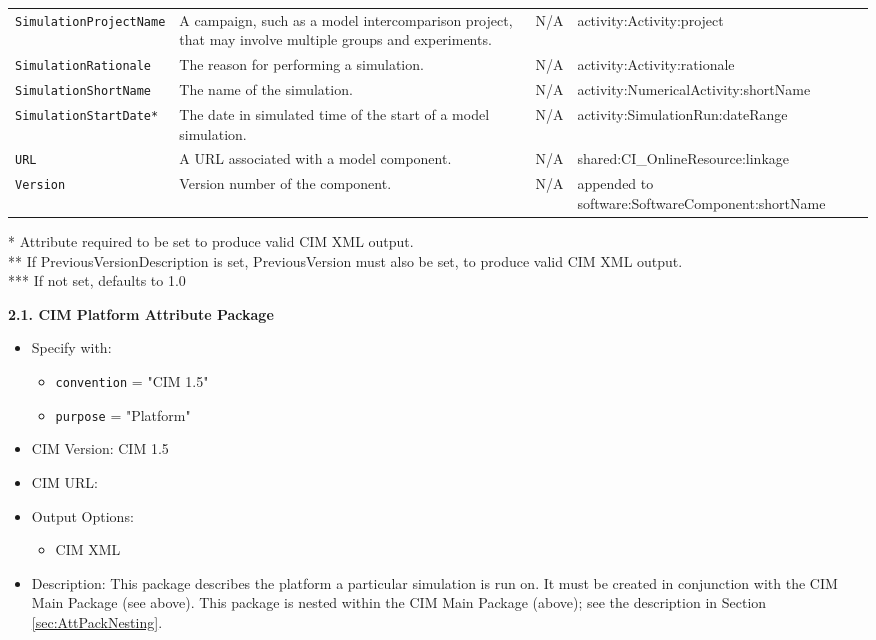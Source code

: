 \begin{tabular}{|p{7cm}|p{5cm}|p{15mm}|p{15mm}|}
     {\tt SimulationProjectName} & A campaign, such as a model intercomparison project, that may involve multiple groups and experiments. & N/A & activity:Activity:project \\
     {\tt SimulationRationale} & The reason for performing a simulation. & N/A  & activity:Activity:rationale \\
     {\tt SimulationShortName} & The name of the simulation. & N/A & activity:NumericalActivity:shortName \\
     {\tt SimulationStartDate*} & The date in simulated time of the start of a model simulation. & N/A & activity:SimulationRun:dateRange \\
     {\tt URL} & A URL associated with a model component. & N/A & shared:CI\_OnlineResource:linkage \\
     {\tt Version} & Version number of the component. & N/A  & appended to software:SoftwareComponent:shortName \\
     \hline\hline
\end{tabular}
\linebreak
 * Attribute required to be set to produce valid CIM XML output. \\
 ** If PreviousVersionDescription is set, PreviousVersion must also be set, to produce valid CIM XML output. \\
 *** If not set, defaults to 1.0

\vspace{.20in}

{\bf 2.1. CIM Platform Attribute Package}

\begin{itemize}
    \item Specify with:
    \begin{itemize}
        \item {\tt convention} = "CIM 1.5"
        \item {\tt purpose} = "Platform"
    \end{itemize}
    \item CIM Version: CIM 1.5
    \item CIM URL: 
    \item Output Options:
    \begin{itemize}
       \item CIM XML 
    \end{itemize} 
    \item Description: This package describes the platform a particular simulation is run on. It must be created in conjunction with the CIM Main Package (see above). This package is nested within the CIM Main Package (above); see the description in Section \ref{sec:AttPackNesting}.
\end{itemize}

